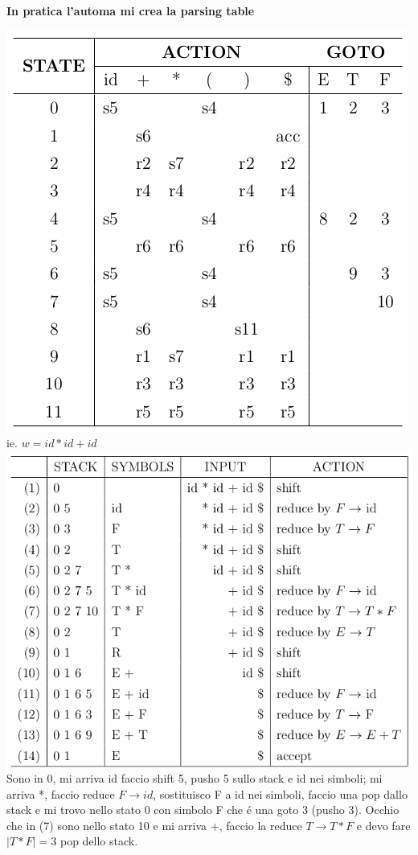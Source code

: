 \begin{center}
    \textbf{In pratica l'automa mi crea la parsing table}

    \includegraphics[scale=0.6]{Chapters/Img/c04_10.png}\\

    ie. $w= id * id + id$\\
    
    \includegraphics[scale=0.6]{Chapters/Img/c04_11.png}\\

    Sono in 0, mi arriva id faccio shift 5, pusho 5 sullo stack e id nei simboli; mi arriva *, faccio reduce $F \rightarrow id$, sostituisco 
    F a id nei simboli, faccio una pop dallo stack e mi trovo nello stato 0 con simbolo F che \'e una goto 3 (pusho 3). 
    Occhio che in (7) sono nello stato 10 e mi arriva +, faccio la reduce $T \rightarrow T * F$ e devo fare $|T * F| = 3$ pop dello stack.
\end{center}

